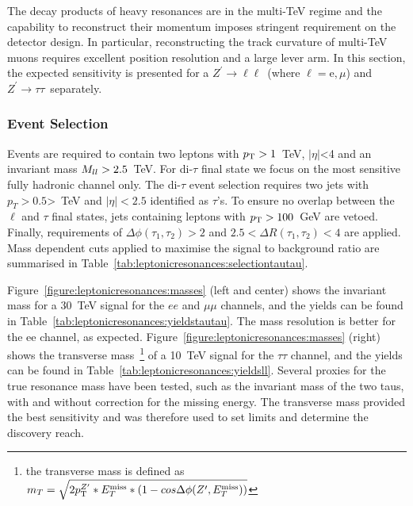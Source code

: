 \documentclass{cernrep}
\newcommand*{\Zptata}{\ensuremath{Z^{\prime}\rightarrow \tau\tau}}
\newcommand*{\Zpll}{\ensuremath{Z^{\prime}\rightarrow \ell\ell}}
\newcommand*{\met}{\ensuremath{E_{T}^{\rm{miss}}}}
\begin{document}
The decay products of heavy resonances are in the multi-TeV regime and the capability to reconstruct their momentum imposes stringent requirement on the detector design. In particular, reconstructing the track curvature of multi-TeV muons requires excellent position resolution and a large lever arm. In this section, the expected sensitivity is presented for a \Zpll\ (where $\ell=\mathrm{e},\mu$) and \Zptata\ separately.

\subsubsection{Event Selection}
Events are required to contain two leptons with $p_{\text{T}} > 1$~TeV, $|\eta|$<4 and an invariant mass $M_{ll} > 2.5$~TeV. For di-$\tau$ final state we focus on the most sensitive fully hadronic channel only. The di-$\tau$ event selection requires two jets with $p_{T} > 0.5$>~TeV and $|\eta|<2.5$ identified as $\tau$'s. To ensure no overlap between the $\ell$ and $\tau$ final states, jets containing leptons with $p_{\text{T}} > 100$~GeV are vetoed. Finally, requirements of $\Delta \phi(\tau_1, \tau_2)> 2$ and $2.5<\Delta R(\tau_1, \tau_2)<4$ are applied.
Mass dependent cuts applied to maximise the signal to background ratio are summarised in Table~\ref{tab:leptonicresonances:selectiontautau}.

Figure~\ref{figure:leptonicresonances:masses} (left and center) shows the invariant mass for a 30~TeV signal for the $ee$ and $\mu\mu$ channels, and the yields can be found in Table~\ref{tab:leptonicresonances:yieldstautau}. The mass resolution is better for the ee channel, as expected. Figure~\ref{figure:leptonicresonances:masses} (right) shows the transverse mass~\footnote{the transverse mass is defined as $m_{T}  =  \sqrt{2\ptZp*\met*(1-cos\Delta\phi(\Zp,\met))} $}
of a 10~TeV signal for the $\tau\tau$ channel, and the yields can be found in Table~\ref{tab:leptonicresonances:yieldsll}.
Several proxies for the true resonance mass have been tested, such as the invariant mass of the two taus, with and without correction for the missing energy. The transverse mass provided the best sensitivity and was therefore used to set limits and determine the discovery reach.
\end{document}
